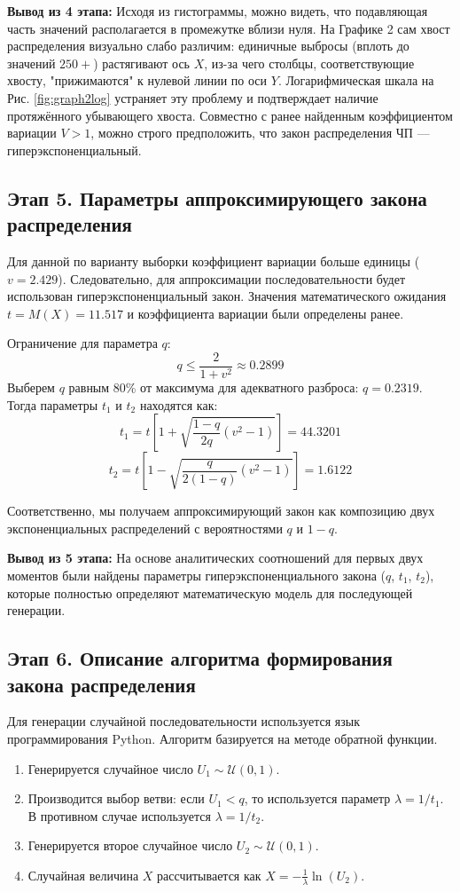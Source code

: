 \documentclass[a4paper,12pt]{article}
\begin{document}
\textbf{Вывод из 4 этапа:} Исходя из гистограммы, можно видеть, что подавляющая часть значений располагается в промежутке вблизи нуля. На Графике 2 сам хвост распределения визуально слабо различим: единичные выбросы (вплоть до значений $250+$) растягивают ось $X$, из-за чего столбцы, соответствующие хвосту, "прижимаются" к нулевой линии по оси $Y$. Логарифмическая шкала на Рис. \ref{fig:graph2log} устраняет эту проблему и подтверждает наличие протяжённого убывающего хвоста. Совместно с ранее найденным коэффициентом вариации $V > 1$, можно строго предположить, что закон распределения ЧП — гиперэкспоненциальный.


\subsection*{Этап 5. Параметры аппроксимирующего закона распределения}
Для данной по варианту выборки коэффициент вариации больше единицы ($v = 2.429$). Следовательно, для аппроксимации последовательности будет использован гиперэкспоненциальный закон. Значения математического ожидания $t = M(X) = 11.517$ и коэффициента вариации были определены ранее.

Ограничение для параметра $q$:
$$ q \le \frac{2}{1 + v^2} \approx 0.2899 $$
Выберем $q$ равным 80\% от максимума для адекватного разброса: $q = 0.2319$. Тогда параметры $t_1$ и $t_2$ находятся как:
$$ t_1 = t \left[ 1 + \sqrt{\frac{1-q}{2q}(v^2 - 1)} \right] = 44.3201 $$
$$ t_2 = t \left[ 1 - \sqrt{\frac{q}{2(1-q)}(v^2 - 1)} \right] = 1.6122 $$

Соответственно, мы получаем аппроксимирующий закон как композицию двух экспоненциальных распределений с вероятностями $q$ и $1-q$.

\textbf{Вывод из 5 этапа:} На основе аналитических соотношений для первых двух моментов были найдены параметры гиперэкспоненциального закона ($q$, $t_1$, $t_2$), которые полностью определяют математическую модель для последующей генерации.


\subsection*{Этап 6. Описание алгоритма формирования закона распределения}
Для генерации случайной последовательности используется язык программирования Python. Алгоритм базируется на методе обратной функции.
\begin{enumerate}
    \item Генерируется случайное число $U_1 \sim \mathcal{U}(0,1)$.
    \item Производится выбор ветви: если $U_1 < q$, то используется параметр $\lambda = 1/t_1$. В противном случае используется $\lambda = 1/t_2$.
    \item Генерируется второе случайное число $U_2 \sim \mathcal{U}(0,1)$.
    \item Случайная величина $X$ рассчитывается как $X = -\frac{1}{\lambda} \ln(U_2)$.
\end{enumerate}
\end{document}
